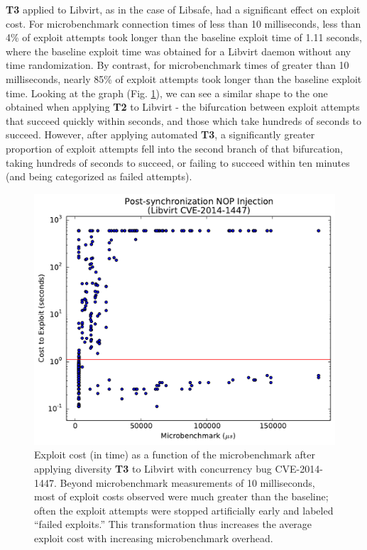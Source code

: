 \textbf{T3} applied to Libvirt, as in the case of Libsafe, had a significant effect on exploit cost.
For microbenchmark connection times of less than 10 milliseconds, less than 4\% of exploit attempts took longer than the baseline exploit time of 1.11 seconds, where the baseline exploit time was obtained for a Libvirt daemon without any time randomization.
By contrast, for microbenchmark times of greater than 10 milliseconds, nearly 85\% of exploit attempts took longer than the baseline exploit time.
Looking at the graph (Fig. \ref{fig_libvirt-post}), we can see a similar shape to the one obtained when applying \textbf{T2} to Libvirt - the bifurcation between exploit attempts that succeed quickly within seconds, and those which take hundreds of seconds to succeed.
However, after applying automated \textbf{T3}, a significantly greater proportion of exploit attempts fell into the second branch of that bifurcation, taking hundreds of seconds to succeed, or failing to succeed within ten minutes (and being categorized as failed attempts).
\begin{figure}
	\centering
	\includegraphics[width=.75\columnwidth]{figures/libvirt-post}
	\caption{
		Exploit cost (in time) as a function of the microbenchmark after applying diversity \textbf{T3} to Libvirt with concurrency bug CVE-2014-1447.
		Beyond microbenchmark measurements of 10 milliseconds, most of exploit costs observed were much greater than the baseline; often the exploit attempts were stopped artificially early and labeled ``failed exploits.''
		This transformation thus increases the average exploit cost with increasing microbenchmark overhead.
	}
	\label{fig_libvirt-post}
\end{figure}
